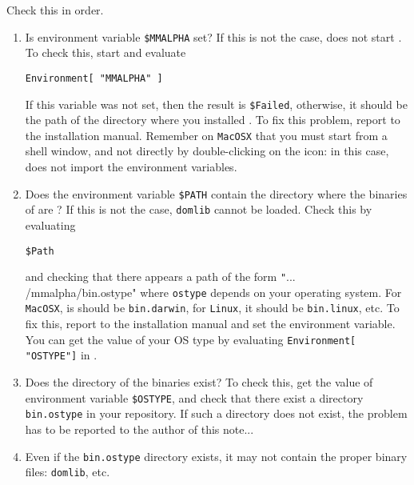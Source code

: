 \documentclass[12pt]{article}
\begin{document}
Check this in order. 
\begin{enumerate}
\item Is environment variable \texttt{\$MMALPHA} set? If this is not the case, \mma{} does not
start \MMAlpha{}. 
To check this, start \MMAlpha{} and evaluate
\begin{verbatim}
Environment[ "MMALPHA" ]
\end{verbatim}
If this variable was not set, then the result is \texttt{\$Failed}, otherwise, it should be the path
of the directory where you installed \MMAlpha{}. To fix this problem, report to the installation 
manual. Remember on \texttt{MacOSX} that you must start \mma{} from a shell window, and not
directly by double-clicking on the \mma{} icon: in this case, \mma{} does not import the 
environment variables.
\item Does the environment variable \texttt{\$PATH} contain the directory where the binaries
of \MMAlpha{} are ? If this is not the case, \texttt{domlib} cannot be loaded. 
Check this by evaluating
\begin{verbatim}
$Path
\end{verbatim}
and checking that there appears a path of the form \texttt"{... /mmalpha/bin.ostype"} where 
\texttt{ostype} depends on your operating system. For \texttt{MacOSX}, is should be
\texttt{bin.darwin}, for \texttt{Linux}, it should be \texttt{bin.linux}, etc. To fix this, report to
the installation manual and set the environment variable. You can get the value of your
OS type by evaluating \texttt{Environment[ "OSTYPE"]} in \mma{}. 
\item Does the directory of the binaries exist? To check this, get the value of environment 
variable \texttt{\$OSTYPE}, and check that there exist a directory \texttt{bin.ostype} in 
your \MMAlpha{} repository. If such a directory does not exist, the problem has to be
reported to the author of this note... 
\item Even if the \texttt{bin.ostype} directory exists, it may not contain the proper 
binary files: \texttt{domlib}, etc. 
\end{enumerate}
\end{document}
